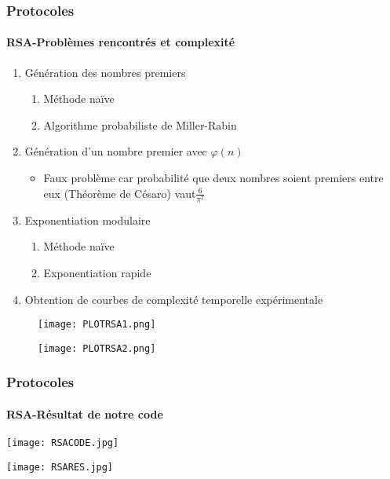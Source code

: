 \documentclass[10pt]{beamer}
\begin{document}
\begin{frame}
\frametitle{Protocoles}
\framesubtitle{RSA-Problèmes rencontrés et complexité}
\begin{enumerate}
\item Génération des nombres premiers
\begin{enumerate}
\item Méthode naïve
\item Algorithme probabiliste de Miller-Rabin
\end{enumerate}
\item Génération d'un nombre premier avec \hspace{0.1cm}$\varphi(n)$
\begin{itemize}
\item Faux problème car probabilité que deux nombres soient premiers entre eux (Théorème de Césaro) vaut\hspace{0.1cm}$\frac{6}{\pi^{2}}$\\
\end{itemize}
\item Exponentiation modulaire
\begin{enumerate}
\item Méthode naïve
\item Exponentiation rapide
\end{enumerate}
\item Obtention de courbes de complexité temporelle expérimentale
\end{enumerate}
\smallskip
\begin{figure}[h]
\centering
\begin{minipage}[c]{.46\linewidth}
\centering
\texttt{[image: PLOTRSA1.png]}
\end{minipage}
\hfill%
\begin{minipage}[c]{.46\linewidth}
\centering
\texttt{[image: PLOTRSA2.png]}
\end{minipage}
\end{figure}
\end{frame}

\begin{frame}
\frametitle{Protocoles}
\framesubtitle{RSA-Résultat de notre code}
\begin{center}
\texttt{[image: RSACODE.jpg]}
\end{center}
\begin{center}
\texttt{[image: RSARES.jpg]}
\end{center}
\end{frame}
\end{document}
